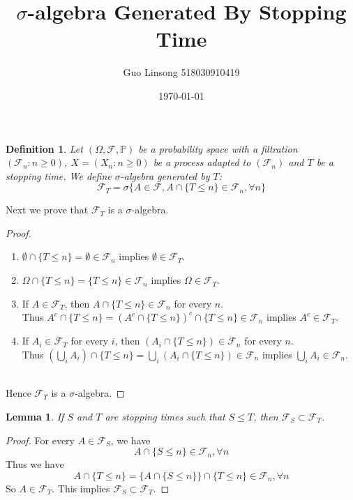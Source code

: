 \documentclass{article}
\title{$\sigma$-algebra Generated By Stopping Time}
\author{Guo Linsong 518030910419}
\date{\today}
\newtheorem{lemma}[theorem]{Lemma}
\newtheorem{definition}[theorem]{Definition}
\begin{document}
\maketitle


\begin{tcolorbox}
    \begin{definition}
        Let $(\Omega, \mathcal{F}, \mathbb{P})$ be a probability space with a filtration $(\mathcal{F}_n:n\geq 0)$, $X =(X_n:n\geq 0)$ be a process adapted to $(\mathcal{F}_n)$ and $T$ be a stopping time. We define $\sigma$-algebra generated by $T$:
        $$\mathcal{F}_{T}=\sigma\{A\in \mathcal{F},A\cap\{T\leq n\}\in\mathcal{F}_n,\forall n\}$$ 
   \end{definition}
\end{tcolorbox}

Next we prove that $\mathcal{F}_T$ is a $\sigma$-algebra.
\begin{proof}
\begin{enumerate}
    \item  $\emptyset \cap \{T\leq n\}=\emptyset\in\mathcal{F}_n$ implies $\emptyset\in\mathcal{F}_T$.
    \item$\Omega\cap\{T\leq n\}=\{T\leq n\}\in\mathcal{F}_n$ implies $\Omega\in\mathcal{F}_T$.
    \item  If $A\in\mathcal{F}_T$, then $A\cap\{T\leq n\}\in\mathcal{F}_n$ for every $n$. \\
    Thus $A^c\cap\{T\leq n\}=(A^c\cap\{T\leq n\})^c\cap\{T\leq n\}\in\mathcal{F}_n$ implies $A^c\in\mathcal{F}_T$.
    \item If $A_i\in\mathcal{F}_T$ for every $i$, then $(A_i\cap\{T\leq n\}) \in\mathcal{F}_n$ for every $n$.\\
    Thus $(\bigcup_i A_i)\cap\{T\leq n\}=\bigcup_i (A_i\cap\{T\leq n\})\in\mathcal{F}_n$ implies $\bigcup_i A_i\in \mathcal{F}_n$.
\end{enumerate}  \\

Hence $\mathcal{F}_T$ is a $\sigma$-algebra.
\end{proof}


    \begin{lemma}
       If $S$ and $T$ are stopping times such that $S\leq T$, then $\mathcal{F}_S\subset\mathcal{F}_T$.
   \end{lemma}
\begin{proof}
For every $A\in\mathcal{F}_S$, we have
$$A\cap\{S\leq n\}\in\mathcal{F}_n, \forall n$$
Thus we have
$$A\cap\{T\leq n\}=\{A\cap\{S\leq n\}\}\cap\{T\leq n\}\in\mathcal{F}_n, \forall n$$
So $A\in\mathcal{F}_T$. This implies $\mathcal{F}_S\subset\mathcal{F}_T$.
\end{proof}
\end{document}
